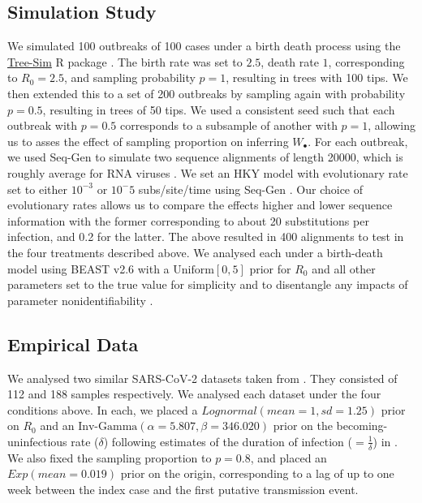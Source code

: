 \documentclass{article}
\begin{document}
\subsection*{Simulation Study}
We simulated 100 outbreaks of 100 cases under a birth death process using the \url{Tree-Sim} R package \citep{TreeSim}. The birth rate was set to $2.5$, death rate $1$, corresponding to $R_{0} = 2.5$, and sampling probability $p=1$, resulting in trees with 100 tips. We then extended this to a set of 200 outbreaks by sampling again with probability $p=0.5$, resulting in trees of 50 tips. We used a consistent seed such that each outbreak with $p=0.5$ corresponds to a subsample of another with $p=1$, allowing us to asses the effect of sampling proportion on inferring $W_{\bullet}$. For each outbreak, we used Seq-Gen to simulate two sequence alignments of length 20000, which is roughly average for RNA viruses \citep{sanjuan2010viral,rambaut_seq-gen_1997}. We set an HKY model with evolutionary rate set to either $10^{-3}$ or $10^-{5}$ subs/site/time using Seq-Gen \cite{rambaut_seq-gen_1997}.  Our choice of evolutionary rates allows us to compare the effects higher and lower sequence information with the former corresponding to about 20 substitutions per infection, and 0.2 for the latter. 
The above resulted in 400 alignments to test in the four treatments described above. We analysed each under a birth-death model using BEAST v2.6 \citet{bouckaert_beast_2019} with a $\textrm{Uniform}[0,5]$ prior for $R_0$ and all other parameters set to the true value for simplicity and to disentangle any impacts of parameter nonidentifiability \citep{louca2021fundamental}.
\subsection*{Empirical Data}
We analysed two similar SARS-CoV-2 datasets taken from \citet{lane2021genomics}. They consisted of 112 and 188 samples respectively. We analysed  each dataset under the four conditions above. In each, we placed a $Lognormal(mean=1, sd=1.25)$ prior on $R_0$ and an $\textrm{Inv-Gamma}(\alpha=5.807, \beta=346.020)$ prior on the becoming-uninfectious rate ($\delta$) following estimates of the duration of infection ($=\frac{1}{\delta}$) in \cite{Lauer2020The}. We also fixed the sampling proportion to $p=0.8$, and placed an $Exp(mean=0.019)$ prior on the origin, corresponding to a lag of up to one week  between the index case and the first putative transmission event.
\end{document}
